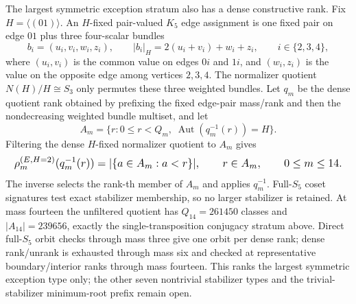 \documentclass{article}
\newcommand{\fitmath}[1]{\resizebox{0.99\linewidth}{!}{$\displaystyle #1$}}
\begin{document}
The largest symmetric exception stratum also has a dense constructive rank.
Fix $H=\langle(01)\rangle$. An $H$-fixed pair-valued $K_5$ edge assignment is
one fixed pair on edge $01$ plus three four-scalar bundles
\[
  b_i=(u_i,v_i,w_i,z_i),
  \qquad |b_i|_H=2(u_i+v_i)+w_i+z_i,
  \qquad i\in\{2,3,4\},
\]
where $(u_i,v_i)$ is the common value on edges $0i$ and $1i$, and
$(w_i,z_i)$ is the value on the opposite edge among vertices $2,3,4$.
The normalizer quotient $N(H)/H\cong S_3$ only permutes these three weighted
bundles. Let $q_m$ be the dense quotient rank obtained by prefixing the fixed
edge-pair mass/rank and then the nondecreasing weighted bundle multiset, and let
\[
  A_m=\{r:0\leq r<Q_m,\;
    \operatorname{Aut}(q_m^{-1}(r))=H\}.
\]
Filtering the dense $H$-fixed normalizer quotient to $A_m$ gives
\begin{equation}
  \fitmath{%
    \rho^{(E,H=2)}_m(q_m^{-1}(r))
      =|\{a\in A_m:a<r\}|,
    \qquad r\in A_m,
    \qquad 0\leq m\leq14.
  }
  \label{eq:optimization-crazy-preimage-cube-quintuple-s5-transposition-ranking}
\end{equation}
The inverse selects the rank-th member of $A_m$ and applies $q_m^{-1}$.
Full-$S_5$ coset signatures test exact stabilizer membership, so no larger
stabilizer is retained. At mass fourteen the unfiltered quotient has
$Q_{14}=261450$ classes and $|A_{14}|=239656$, exactly the single-transposition
conjugacy stratum above. Direct full-$S_5$ orbit checks through mass three give
one orbit per dense rank; dense rank/unrank is exhausted through mass six and
checked at representative boundary/interior ranks through mass fourteen. This
ranks the largest symmetric exception type only; the other seven nontrivial
stabilizer types and the trivial-stabilizer minimum-root prefix remain open.
\end{document}
